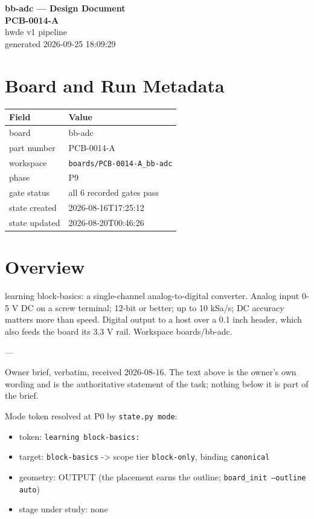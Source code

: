 \documentclass[11pt,a4paper]{article}
\begin{document}
\sloppy
\begin{center}
{\LARGE\bfseries bb-adc --- Design Document}\\[6pt]
{\Large\bfseries PCB-0014-A}\\[6pt]
{\large hwde v1 pipeline}\\[2pt]
generated 2026-09-25 18:09:29
\end{center}
\tableofcontents

\section{Board and Run Metadata}
{\small
\begin{longtable}{lp{11cm}}
\toprule
\textbf{Field} & \textbf{Value} \\
\midrule
\endhead
board & bb-adc \\
part number & PCB-0014-A \\
workspace & \texttt{boards/PCB-0014-A\_bb-adc} \\
phase & P9 \\
gate status & all 6 recorded gates pass \\
state created & 2026-08-16T17:25:12 \\
state updated & 2026-08-20T00:46:26 \\
\bottomrule
\end{longtable}
}
\section{Overview}
learning block-basics: a single-channel analog-to-digital converter. Analog input 0-5 V DC on a screw terminal; 12-bit or better; up to 10 kSa/s; DC accuracy matters more than speed. Digital output to a host over a 0.1 inch header, which also feeds the board its 3.3 V rail. Workspace boards/bb-adc.

---

Owner brief, verbatim, received 2026-08-16. The text above is the owner's own wording and is the authoritative statement of the task; nothing below it is part of the brief.

Mode token resolved at P0 by \texttt{state.py mode}:

\begin{itemize}
\item token: \texttt{learning block-basics:}
\item target: \texttt{block-basics} -\textgreater{} scope tier \texttt{block-only}, binding \texttt{canonical}
\item geometry: OUTPUT (the placement earns the outline; \texttt{board\_init --outline auto})
\item stage under study: none
\end{itemize}
\end{document}
